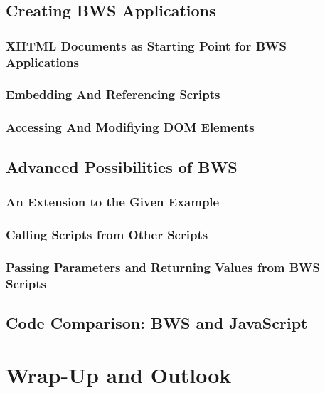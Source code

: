  \section{Creating BWS Applications}
 \label{sec:CreatingBWSApplications}
 
  \subsection{XHTML Documents as Starting Point for BWS Applications}
  \label{sec:XHTMLDocumentsAsStartingPoint}

   

  \subsection{Embedding And Referencing Scripts}

 

  \subsection{Accessing And Modifiying DOM Elements}


 \section{Advanced Possibilities of BWS}
  \subsection{An Extension to the Given Example}
  \subsection{Calling Scripts from Other Scripts}
  \subsection{Passing Parameters and Returning Values from BWS Scripts}
 \section{Code Comparison: BWS and JavaScript}
\chapter{Wrap-Up and Outlook}

 